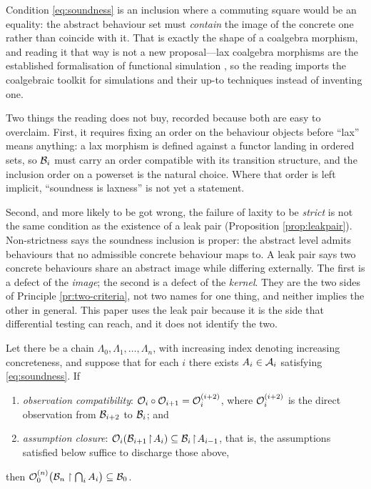 \begin{remark}\label{rmk:lax}
Condition \eqref{eq:soundness} is an inclusion where a commuting square would be an equality: the
abstract behaviour set must \emph{contain} the image of the concrete one rather than coincide with
it. That is exactly the shape of a  coalgebra morphism, and reading it that way is not a
new proposal---lax coalgebra morphisms are the established formalisation of functional simulation
\cite{rot2023}, so the reading imports the coalgebraic toolkit for simulations and their up-to
techniques instead of inventing one.

Two things the reading does not buy, recorded because both are easy to overclaim. First, it requires
fixing an order on the behaviour objects before ``lax'' means anything: a lax morphism is defined
against a functor landing in ordered sets, so $\mathcal{B}_i$ must carry an order compatible with its
transition structure, and the inclusion order on a powerset is the natural choice. Where that order
is left implicit, ``soundness is laxness'' is not yet a statement.

Second, and more likely to be got wrong, the failure of laxity to be \emph{strict} is not the same
condition as the existence of a leak pair (Proposition \ref{prop:leakpair}). Non-strictness says the
soundness inclusion is proper: the abstract level admits behaviours that no admissible concrete
behaviour maps to. A leak pair says two concrete behaviours share an abstract image while differing
externally. The first is a defect of the \emph{image}; the second is a defect of the \emph{kernel}.
They are the two sides of Principle \ref{pr:two-criteria}, not two names for one thing, and neither
implies the other in general. This paper uses the leak pair because it is the side that differential
testing can reach, and it does not identify the two.
\end{remark}

\begin{proposition}\label{prop:soundness}
Let there be a chain $\Lambda_0, \Lambda_1, \dots, \Lambda_n$, with increasing index
denoting increasing concreteness, and suppose that for each $i$ there exists
$A_i \in \mathcal{A}_i$ satisfying \eqref{eq:soundness}. If
\begin{enumerate}[label=(\alph*)]
\item \emph{observation compatibility}: $\mathcal{O}_i \circ \mathcal{O}_{i+1} = \mathcal{O}_i^{(i+2)}$, where
      $\mathcal{O}_i^{(i+2)}$ is the direct observation from $\mathcal{B}_{i+2}$ to $\mathcal{B}_i$; and
\item \emph{assumption closure}:
      $\mathcal{O}_i(\mathcal{B}_{i+1}\!\upharpoonright\! A_i) \subseteq \mathcal{B}_i\!\upharpoonright\! A_{i-1}$,
      that is, the assumptions satisfied below suffice to discharge those above,
\end{enumerate}
then $\mathcal{O}_0^{(n)}\bigl(\mathcal{B}_n \upharpoonright \bigcap_i A_i\bigr) \subseteq \mathcal{B}_0$.
\end{proposition}

